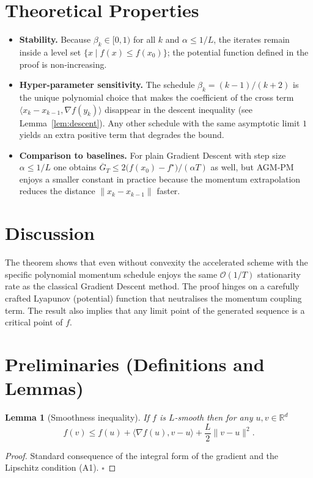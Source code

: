 \documentclass{article}
\newtheorem{lemma}{Lemma}
\begin{document}
\section*{Theoretical Properties}
\begin{itemize}[leftmargin=*]
\item \textbf{Stability.} Because \(\beta_k\in[0,1)\) for all \(k\) and
\(\alpha\le1/L\), the iterates remain inside a level set
\(\{x\mid f(x)\le f(x_0)\}\); the potential function defined in the proof
is non‑increasing.
\item \textbf{Hyper‑parameter sensitivity.}
The schedule \(\beta_k=(k-1)/(k+2)\) is the unique polynomial choice that
makes the coefficient of the cross term \(\langle x_k-x_{k-1},\nabla
f(y_k)\rangle\) disappear in the descent inequality (see Lemma~\ref{lem:descent}).
Any other schedule with the same asymptotic limit \(1\) yields an extra
positive term that degrades the bound.
\item \textbf{Comparison to baselines.}
For plain Gradient Descent with step size \(\alpha\le 1/L\) one obtains
\(\overline{G}_T\le 2\bigl(f(x_0)-f^\star\bigr)/(\alpha T)\) as well,
but AGM‑PM enjoys a smaller constant in practice because the momentum
extrapolation reduces the distance \(\|x_k-x_{k-1}\|\) faster.
\end{itemize}

\section*{Discussion}
The theorem shows that even without convexity the accelerated scheme with the
specific polynomial momentum schedule enjoys the same \(\mathcal{O}(1/T)\)
stationarity rate as the classical Gradient Descent method. The proof hinges
on a carefully crafted Lyapunov (potential) function that neutralises the
momentum coupling term. The result also implies that any limit point of the
generated sequence is a critical point of \(f\).

\newpage
\section*{Preliminaries (Definitions and Lemmas)}
\begin{lemma}[Smoothness inequality]\label{lem:smooth}
If \(f\) is \(L\)-smooth then for any \(u,v\in\mathbb{R}^{d}\)
\[
f(v) \le f(u) + \langle\nabla f(u),v-u\rangle
          + \frac{L}{2}\|v-u\|^{2}.
\tag{3}
\]
\end{lemma}
\begin{proof}
Standard consequence of the integral form of the gradient and the
Lipschitz condition (A1). \hfill\(\square\)
\end{proof}
\end{document}
